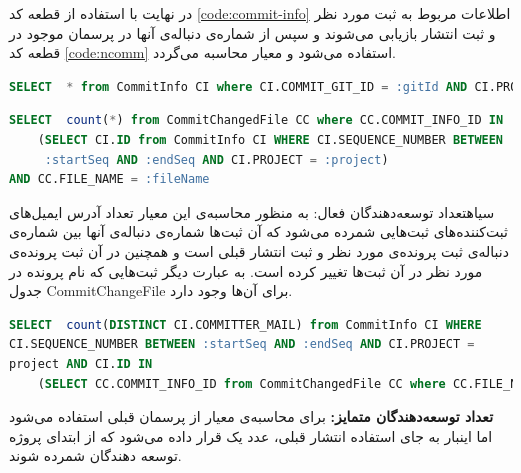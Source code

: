 در نهایت با استفاده از قطعه کد \ref{code:commit-info} اطلاعات مربوط به ثبت مورد نظر و ثبت انتشار بازیابی می‌شوند و سپس  از شماره‌ی دنباله‌ی آنها در پرسمان موجود در قطعه کد \ref{code:ncomm} استفاده می‌شود و معیار محاسبه می‌گردد.



\begin{latin}
	\begin{lstlisting}[language=SQL]
SELECT  * from CommitInfo CI where CI.COMMIT_GIT_ID = :gitId AND CI.PROJECT = :project
\end{lstlisting}
\end{latin}
\label{code:commit-info}

\begin{latin}
\begin{lstlisting}[language=SQL]
SELECT  count(*) from CommitChangedFile CC where CC.COMMIT_INFO_ID IN
	(SELECT CI.ID from CommitInfo CI WHERE CI.SEQUENCE_NUMBER BETWEEN 
	 :startSeq AND :endSeq AND CI.PROJECT = :project)
AND CC.FILE_NAME = :fileName
\end{lstlisting}
\end{latin}
\label{code:comm}

‌سیاه{‫تعداد توسعه‌دهندگان فعال:‬}
به منظور محاسبه‌ی این معیار تعداد آدرس ایمیل‌های ثبت‌کننده‌های ثبت‌هایی شمرده می‌شود که آن ثبت‌ها شماره‌ی دنباله‌ی آنها بین شماره‌ی دنباله‌ی ثبت پرونده‌ی مورد نظر و ثبت انتشار قبلی است و همچنین در آن ثبت پرونده‌ی مورد نظر در آن ثبت‌ها تغییر کرده است. به عبارت دیگر ثبت‌هایی که نام پرونده در جدول  CommitChangeFile  برای آن‌ها وجود دارد. 

\begin{latin}
\begin{lstlisting}[language=SQL]
SELECT  count(DISTINCT CI.COMMITTER_MAIL) from CommitInfo CI WHERE
CI.SEQUENCE_NUMBER BETWEEN :startSeq AND :endSeq AND CI.PROJECT = 
project AND CI.ID IN 
	(SELECT CC.COMMIT_INFO_ID from CommitChangedFile CC where CC.FILE_NAME = :fileName)
\end{lstlisting}
\end{latin}

\textbf{تعداد توسعه‌دهندگان متمایز:}
برای محاسبه‌ی معیار از پرسمان قبلی استفاده می‌شود اما اینبار به جای استفاده  انتشار قبلی، عدد یک  قرار داده می‌شود که از ابتدای پروژه توسعه دهندگان شمرده شوند. 
\\


